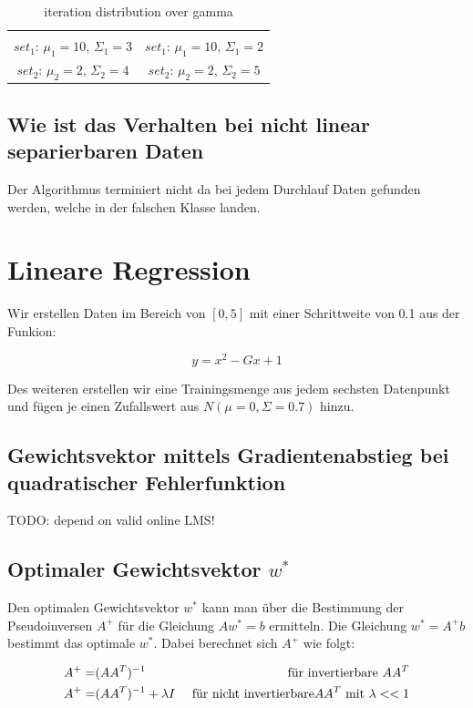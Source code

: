 \documentclass[]{report}
\begin{document}
\begin{table}[h]
\begin{tabular}{| c | c |}
 & \\
$set_1$: $\mu_1=10$, $\Sigma_1=3$ & $set_1$: $\mu_1=10$, $\Sigma_1=2$ \\
$set_2$: $\mu_2=2$, $\Sigma_2=4$ & $set_2$: $\mu_2=2$, $\Sigma_2=5$ \\
\hline
\end{tabular}
\caption{iteration distribution over gamma}
\label{tab:DataSetsAndBounds}
\end{table}


\subsection{Wie ist das Verhalten bei nicht linear separierbaren Daten}

Der Algorithmus terminiert nicht da bei jedem Durchlauf Daten gefunden werden, welche in der falschen Klasse landen.

\section{Lineare Regression}

Wir erstellen Daten im Bereich von $[0,5]$ mit einer Schrittweite von 0.1 aus der Funkion:

\begin{equation}
y=x^2-Gx+1
\end{equation}

Des weiteren erstellen wir eine Trainingsmenge aus jedem sechsten Datenpunkt und f\"ugen je einen Zufallswert aus $N(\mu=0,\Sigma=0.7)$ hinzu.

\subsection{Gewichtsvektor mittels Gradientenabstieg bei quadratischer Fehlerfunktion}

TODO: depend on valid online LMS!

\subsection{Optimaler Gewichtsvektor $w^*$}

Den optimalen Gewichtsvektor $w^*$ kann man \"uber die Bestimmung der Pseudoinversen $A^+$ f\"ur die Gleichung $Aw^*=b$ ermitteln.
Die Gleichung $w^*=A^+b$ bestimmt das optimale $w^*$. 
Dabei berechnet sich $A^+$ wie folgt:

\begin{eqnarray}
A^+ =& (AA^T)^{-1} &\textnormal{ f\"ur invertierbare } AA^T \\
A^+ =& (AA^T)^{-1} + \lambda I &\textnormal{ f\"ur nicht invertierbare} AA^T \textnormal{ mit } \lambda<<1
\end{eqnarray}
\end{document}
